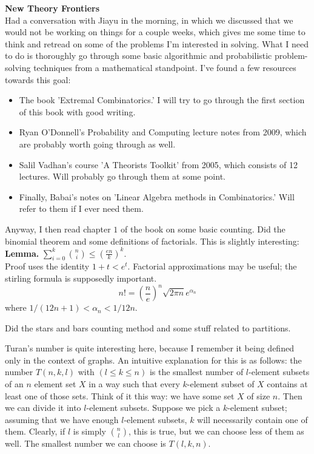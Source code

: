\documentclass{tufte-book}
\newenvironment{loggentry}[2]%
{\noindent\textbf{#2}\marginnote{#1}\\}{\vspace{0.5cm}}
\begin{document}
	
	
	\begin{loggentry}{2024-Feb-14}{New Theory Frontiers}
		Had a conversation with Jiayu in the morning, in which we discussed that we would not be working on things for a couple weeks, which gives me some time to think and retread on some of the problems I'm interested in solving. What I need to do is thoroughly go through some basic algorithmic and probabilistic problem-solving techniques from a mathematical standpoint. I've found a few resources towards this goal:
		\begin{itemize}
			\item The book 'Extremal Combinatorics.' I will try to go through the first section of this book with good writing.
			\item Ryan O'Donnell's Probability and Computing lecture notes from 2009, which are probably worth going through as well.
			\item Salil Vadhan's course 'A Theorists Toolkit' from 2005, which consists of 12 lectures. Will probably go through them at some point.
			\item Finally, Babai's notes on 'Linear Algebra methods in Combinatorics.' Will refer to them if I ever need them.
		\end{itemize}
	
	Anyway, I then read chapter $1$ of the book on some basic counting. Did the binomial theorem and some definitions of factorials. This is slightly interesting:\\
	
	\textbf{Lemma.} $\sum_{i=0}^k\binom{n}{i}\leq\left(\frac{en}{k}\right)^k$.\\
	
	Proof uses the identity $1+t<e^t$. Factorial approximations may be useful; the stirling formula is supposedly important.
	$$n!=\left(\frac{n}{e}\right)^n\sqrt{2\pi n}e^{\alpha_n}$$
	where $1/(12n+1)<\alpha_n<1/12n$.
	
	Did the stars and bars counting method and some stuff related to partitions.
	
	Turan's number is quite interesting here, because I remember it being defined only in the context of graphs. An intuitive explanation for this is as follows: the number $T(n,k,l)$ with $(l\leq k\leq n)$ is the smallest number of $l$-element subsets of an $n$ element set $X$ in a way such that every $k$-element subset of $X$ contains at least one of those sets. Think of it this way: we have some set $X$ of size $n$. Then we can divide it into $l$-element subsets. Suppose we pick a $k$-element subset; assuming that we have enough $l$-element subsets, $k$ will necessarily contain one of them. Clearly, if $l$ is simply $\binom{n}{l}$, this is true, but we can choose less of them as well. The smallest number we can choose is $T(l,k,n)$.
	

\end{loggentry}
\end{document}
